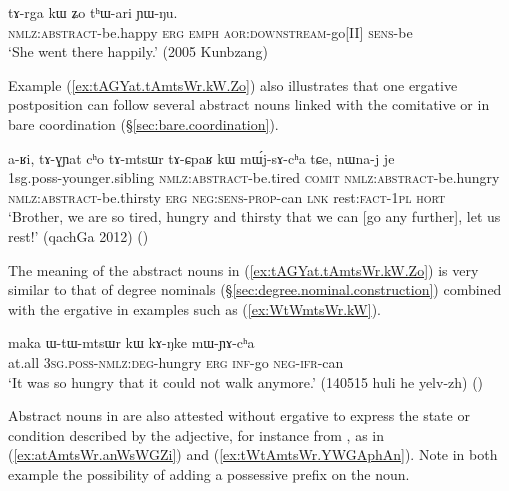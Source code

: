 
\begin{exe}
\ex \label{ex:tArga.kW.Zo}
\gll  tɤ-rga kɯ ʑo tʰɯ-ari ɲɯ-ŋu. \\
\textsc{nmlz}:\textsc{abstract}-be.happy \textsc{erg} \textsc{emph} \textsc{aor}:\textsc{downstream}-go[II] \textsc{sens}-be \\
\glt  `She went there happily.' (2005 Kunbzang)
\end{exe}

Example (\ref{ex:tAGYat.tAmtsWr.kW.Zo}) also illustrates that one ergative postposition can follow several abstract nouns linked with the comitative  or in bare coordination (§\ref{sec:bare.coordination}). 

\begin{exe}
\ex \label{ex:tAGYat.tAmtsWr.kW.Zo}
\gll  a-ʁi, tɤ-ɣɲat cʰo tɤ-mtsɯr tɤ-ɕpaʁ kɯ mɯ́j-sɤ-cʰa tɕe, nɯna-j je \\
1sg.poss-younger.sibling \textsc{nmlz}:\textsc{abstract}-be.tired \textsc{comit} \textsc{nmlz}:\textsc{abstract}-be.hungry \textsc{nmlz}:\textsc{abstract}-be.thirsty \textsc{erg} \textsc{neg}:\textsc{sens}-\textsc{prop}-can \textsc{lnk} rest:\textsc{fact}-\textsc{1pl} \textsc{hort} \\
\glt `Brother, we are so tired, hungry and thirsty that we can [go any further], let us rest!' (qachGa 2012) ()
\end{exe}

The meaning of the abstract nouns in (\ref{ex:tAGYat.tAmtsWr.kW.Zo}) is very similar to that of degree nominals (§\ref{sec:degree.nominal.construction}) combined with the ergative in examples such as (\ref{ex:WtWmtsWr.kW}).
 
\begin{exe}
\ex \label{ex:WtWmtsWr.kW}
\gll  maka ɯ-tɯ-mtsɯr kɯ kɤ-ŋke mɯ-ɲɤ-cʰa \\
at.all \textsc{3sg}.\textsc{poss}-\textsc{nmlz}:\textsc{deg}-hungry \textsc{erg} \textsc{inf}-go \textsc{neg}-\textsc{ifr}-can \\
\glt `It was so hungry that it could not walk anymore.'  (140515 huli he yelv-zh)
()
\end{exe}

Abstract nouns in  are also attested without ergative to express the state or condition described by the adjective, for instance  from , as in (\ref{ex:atAmtsWr.anWsWGZi}) and (\ref{ex:tWtAmtsWr.YWGAphAn}). Note in both example the possibility of adding a possessive prefix on the noun.

